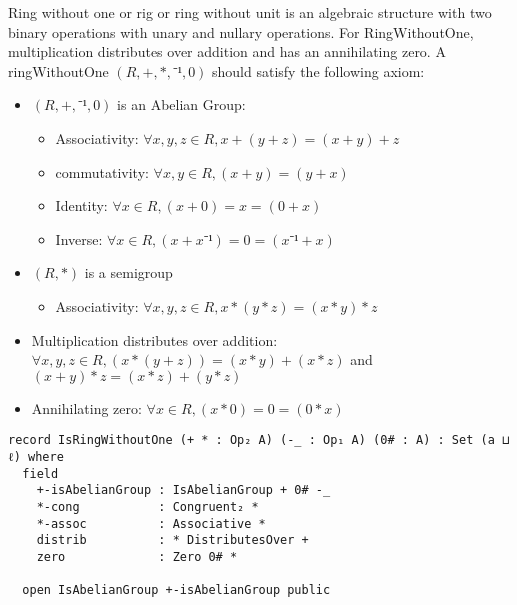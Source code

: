 Ring without one or rig or ring without unit is an algebraic structure with two
binary operations with unary and nullary operations. For RingWithoutOne,
multiplication distributes over addition and has an annihilating zero. A
ringWithoutOne $(R,+,*,⁻¹,0)$ should satisfy the following axiom:
\begin{itemize}
  \item $(R,+,⁻¹,0)$ is an Abelian Group:
   \begin{itemize}
    \item Associativity: $\forall x,y,z \in R, x + (y + z) = (x + y) + z$
    \item commutativity: $\forall x,y \in R, (x + y) = (y + x)$
    \item Identity: $\forall x \in R, (x + 0) = x = (0 + x)$
    \item Inverse: $\forall x \in R, (x + x⁻¹) = 0 = (x⁻¹ + x)$
  \end{itemize}
  \item $(R,*)$ is a semigroup
  \begin{itemize}
    \item Associativity: $ \forall x,y,z \in R, x * (y*z)  = (x*y)*z$
  \end{itemize}
  \item Multiplication distributes over addition: \(\forall x , y , z \in R, (x * (y + z)) = (x * y) + (x
  * z)\) and \( (x + y) * z = (x * z) + (y * z) \)
  \item Annihilating zero: \(\forall x \in R, (x * 0) = 0 = (0 * x)\)
\end{itemize}

\begin{verbatim}
record IsRingWithoutOne (+ * : Op₂ A) (-_ : Op₁ A) (0# : A) : Set (a ⊔ ℓ) where
  field
    +-isAbelianGroup : IsAbelianGroup + 0# -_
    *-cong           : Congruent₂ *
    *-assoc          : Associative *
    distrib          : * DistributesOver +
    zero             : Zero 0# *

  open IsAbelianGroup +-isAbelianGroup public
\end{verbatim}
